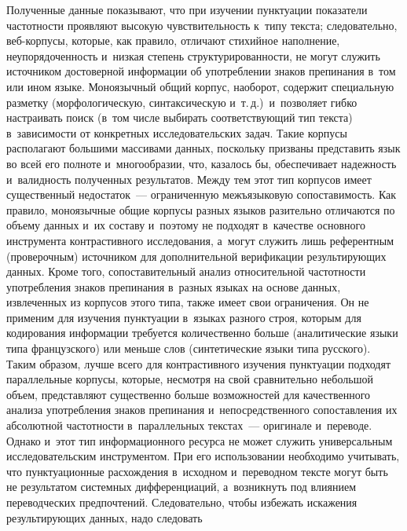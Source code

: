\begin{multicols}{2}
  Полученные данные показывают, что при изучении пунктуации показатели 
час\-тот\-ности проявляют высокую чув\-ст\-ви\-тель\-ность к~типу текс\-та; 
следовательно, веб-кор\-пу\-сы, которые, как правило, отличают стихийное 
наполнение, не\-упо\-ря\-до\-чен\-ность и~низ\-кая степень струк\-ту\-ри\-ро\-ван\-ности, не 
могут служить источником до\-сто\-вер\-ной информации об упо\-треб\-ле\-нии 
знаков препинания в~том или ином языке. Моноязычный общий корпус, 
наоборот, содержит специальную раз\-мет\-ку (морфологическую, 
синтаксическую и~т.\,д.)\ и~поз\-во\-ля\-ет гиб\-ко настраивать поиск (в~том чис\-ле 
выбирать соответствующий тип текс\-та) в~за\-ви\-си\-мости от конкретных 
исследовательских задач. Такие корпусы располагают большими массивами 
данных, поскольку призваны пред\-ста\-вить язык во всей его пол\-но\-те 
и~многообразии, что, казалось бы, обеспечивает на\-деж\-ность и~ва\-лид\-ность 
полученных результатов. Меж\-ду тем этот тип корпусов имеет существенный 
недостаток~--- ограниченную межъязыковую со\-по\-ста\-ви\-мость. Как правило, 
моноязычные общие корпусы разных языков разительно отличаются по 
объему данных и~их со\-ста\-ву и~поэтому не подходят в~качестве основного 
инструмента контрастивного исследования, а~могут служить лишь 
референтным (проверочным) источником для дополнительной верификации 
ре\-зуль\-ти\-ру\-ющих данных. Кроме того, со\-по\-ста\-ви\-тель\-ный анализ 
относительной час\-тот\-ности упо\-треб\-ле\-ния знаков препинания в~разных 
языках на основе данных, извлеченных из корпусов этого типа, так\-же имеет 
свои ограничения. Он не применим для изучения пунк\-ту\-а\-ции в~языках 
разного строя, которым для кодирования информации требуется 
количественно больше (аналитические языки типа французского) или 
меньше слов (синтетические языки типа русского). Таким образом, лучше 
всего для контрастивного изуче\-ния пунк\-ту\-а\-ции подходят параллельные 
корпусы, которые, не\-смот\-ря на свой сравнительно небольшой объем, 
пред\-став\-ля\-ют существенно больше воз\-мож\-но\-стей для качественного анализа 
упо\-треб\-ле\-ния знаков препинания и~непосредственного со\-по\-став\-ле\-ния их 
абсолютной час\-тот\-ности в~параллельных текс\-тах~--- оригинале и~переводе. 
Однако и~этот тип информационного ресурса не может служить 
универсальным исследовательским инструментом. При его использовании 
необходимо учитывать, что пунктуационные рас\-хож\-де\-ния в~исходном 
и~переводном текс\-те могут быть не результатом сис\-тем\-ных дифференциаций, 
а~возникнуть под влиянием переводческих предпочтений. Следовательно, 
чтобы избежать искажения ре\-зуль\-ти\-ру\-ющих данных, надо следовать 

\end{multicols}
